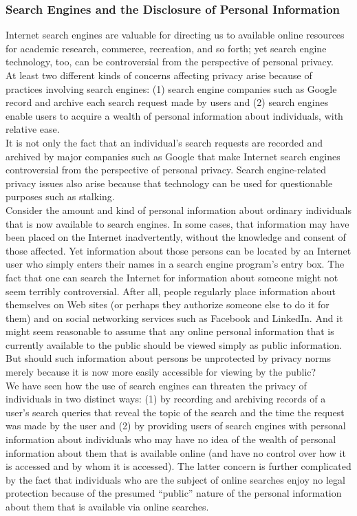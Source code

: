 \documentclass[12pt]{article}
\theoremstyle{definition}
\begin{document}
\subsubsection{Search Engines and the Disclosure of Personal Information}
Internet search engines are valuable for directing us to available online resources for
academic research, commerce, recreation, and so forth; yet search engine technology, too, can be controversial from the perspective of personal
privacy.\\
At least two
different kinds of concerns affecting privacy arise because of practices involving search
engines: (1) search engine companies such as Google record and archive each search request made by users and (2) search engines enable users to acquire a wealth of personal
information about individuals, with relative ease.\\
It is not only the fact that an individual’s search requests are recorded and archived by
major companies such as Google that make Internet search engines controversial from
the perspective of personal privacy. Search engine-related privacy issues also arise
because that technology can be used for questionable purposes such as stalking.\\
Consider the amount and kind of personal
information about ordinary individuals that is now available to search engines. In
some cases, that information may have been placed on the Internet inadvertently,
without the knowledge and consent of those affected. Yet information about those
persons can be located by an Internet user who simply enters their names in a search
engine program’s entry box. The fact that one can search the Internet for information
about someone might not seem terribly controversial. After all, people regularly place
information about themselves on Web sites (or perhaps they authorize someone else to
do it for them) and on social networking services such as Facebook and LinkedIn. And it
might seem reasonable to assume that any online personal information that is currently
available to the public should be viewed simply as public information. But should such
information about persons be unprotected by privacy norms merely because it is now
more easily accessible for viewing by the public?\\
We have seen how the use of search engines can threaten the privacy of individuals in
two distinct ways: (1) by recording and archiving records of a user’s search queries that
reveal the topic of the search and the time the request was made by the user and (2) by
providing users of search engines with personal information about individuals who may
have no idea of the wealth of personal information about them that is available online
(and have no control over how it is accessed and by whom it is accessed). The latter
concern is further complicated by the fact that individuals who are the subject of online
searches enjoy no legal protection because of the presumed “public” nature of the
personal information about them that is available via online searches.
\end{document}
